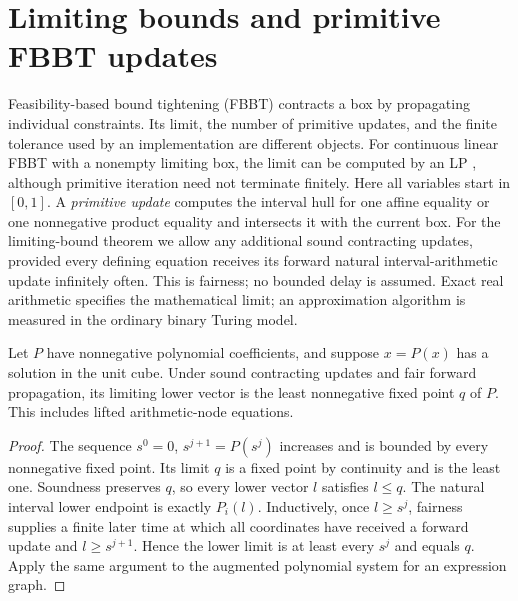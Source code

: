 \section{Limiting bounds and primitive FBBT updates}\label{app:fbbt}
Feasibility-based bound tightening (FBBT) contracts a box by propagating
individual constraints. Its limit, the number of primitive updates, and
the finite tolerance used by an implementation are different objects.
For continuous linear FBBT with a nonempty limiting box, the limit can be
computed by an LP \citep[Theorem~4.1]{BelottiEtAl2012}, although primitive
iteration need not terminate finitely.
Here all variables start in $[0,1]$. A \emph{primitive update} computes the
interval hull for one affine equality or one nonnegative product equality
and intersects it with the current box. For the limiting-bound theorem
we allow any additional sound contracting updates, provided every
defining equation receives its forward natural interval-arithmetic
update infinitely often. This is fairness; no bounded delay is
assumed. Exact real arithmetic
specifies the mathematical limit; an approximation algorithm is measured
in the ordinary binary Turing model.

\begin{lemma}\label{lem:fbbt-fixed-point}
Let $P$ have nonnegative polynomial coefficients, and suppose $x=P(x)$
has a solution in the unit cube. Under sound contracting updates and fair forward
propagation, its limiting lower vector is the least nonnegative fixed
point $q$ of $P$. This includes lifted arithmetic-node equations.
\end{lemma}
\begin{proof}
The sequence $s^0=0$, $s^{j+1}=P(s^j)$ increases and is bounded by every
nonnegative fixed point. Its limit $q$ is a fixed point by continuity and
is the least one. Soundness preserves $q$, so every lower vector $l$
satisfies $l\le q$. The natural interval lower endpoint is exactly $P_i(l)$.
Inductively, once $l\ge s^j$, fairness supplies a finite later time at
which all coordinates have received a forward update and $l\ge s^{j+1}$.
Hence the lower limit is at least every $s^j$ and equals $q$. Apply the
same argument to the augmented polynomial system for an expression graph.
\end{proof}

